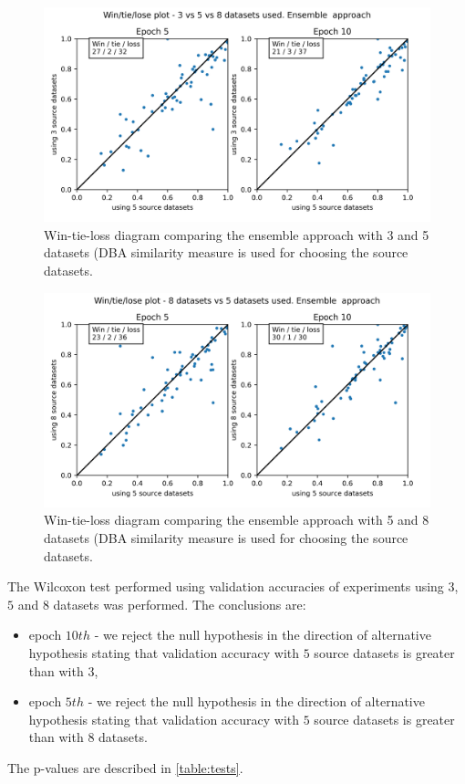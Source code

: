 \documentclass[a4paper,11pt,twoside]{report}
\theoremstyle{definition}
\begin{document}
\FloatBarrier
\begin{figure}[h!t]
\centering
\includegraphics[width=17cm]{imgs/ensemble_dba_3_vs_5/win_tie_lose_epoch.png}
\caption{Win-tie-loss diagram comparing the ensemble approach with 3 and 5 datasets (DBA similarity measure is used for choosing the source datasets.}
\label{fig:ensemble_3_5_win_tie_loss}
\end{figure}
\FloatBarrier
\begin{figure}[h!t]
\centering
\includegraphics[width=17cm]{imgs/ensemble_dba_5_vs_8/win_tie_lose_epoch.png}
\caption{Win-tie-loss diagram comparing the ensemble approach with 5 and 8 datasets (DBA similarity measure is used for choosing the source datasets.}
\label{fig:ensemble_5_8_win_tie_loss}
\end{figure}
\FloatBarrier
The Wilcoxon test performed using validation accuracies of experiments using $3$, $5$ and $8$ datasets was performed. The conclusions are:
\begin{itemize}
\item epoch $10th$ -  we reject the null hypothesis in the direction of alternative hypothesis stating that validation accuracy with $5$ source datasets is greater than with $3$,
\item epoch $5th$ -  we reject the null hypothesis in the direction of alternative hypothesis stating that validation accuracy with $5$ source datasets is greater than with $8$ datasets.
\end{itemize}
The p-values are described in \ref{table:tests}.
\end{document}
